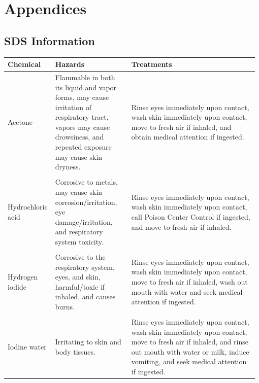 \appendix
{}
\section{Appendices}
\subsection{SDS Information} %
\label{app:SDS}

\begin{tabular}{p{0.18\linewidth}p{0.3\linewidth}p{0.5\linewidth}}
\toprule
Chemical & Hazards & Treatments \\
\midrule
Acetone & Flammable in both its liquid and vapor forms, may cause irritation of respiratory tract, vapors may cause drowsiness, and repeated exposure may cause skin dryness. & Rinse eyes immediately upon contact, wash skin immediately upon contact, move to fresh air if inhaled, and obtain medical attention if ingested. \\ \\
Hydrochloric acid & Corrosive to metals, may cause skin corrosion/irritation, eye damage/irritation, and respiratory system toxicity. & Rinse eyes immediately upon contact, wash skin immediately upon contact, call Poison Center Control if ingested, and move to fresh air if inhaled. \\ \\
Hydrogen iodide & Corrosive to the respiratory system, eyes, and skin, harmful/toxic if inhaled, and causes burns. & Rinse eyes immediately upon contact, wash skin immediately upon contact, move to fresh air if inhaled, wash out mouth with water and seek medical attention if ingested. \\ \\
Iodine water & Irritating to skin and body tissues. & Rinse eyes immediately upon contact, wash skin immediately upon contact, move to fresh air if inhaled, and rinse out mouth with water or milk, induce vomiting, and seek medical attention if ingested. \\
\bottomrule
\end{tabular}
